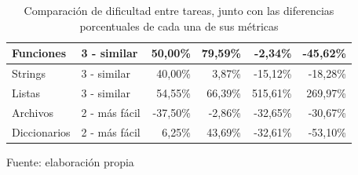 \documentclass[letterpaper,12pt]{article}
\begin{document}
\begin{table}[H]
\begin{tabular}{|l|l|r|r|r|r|}
    Funciones       & 3 - similar                                                                  & 50,00\%                                                                                                   & 79,59\%                                                                                         & -2,34\%                                                                                    & -45,62\%                                                                                  \\ \hline
    Strings         & 3 - similar                                                                  & 40,00\%                                                                                                   & 3,87\%                                                                                          & -15,12\%                                                                                   & -18,28\%                                                                                  \\ \hline
    Listas          & 3 - similar                                                                  & 54,55\%                                                                                                   & 66,39\%                                                                                         & 515,61\%                                                                                   & 269,97\%                                                                                  \\ \hline
    Archivos        & 2 - más fácil                                                                & -37,50\%                                                                                                  & -2,86\%                                                                                         & -32,65\%                                                                                   & -30,67\%                                                                                  \\ \hline
    Diccionarios    & 2 - más fácil                                                                & 6,25\%                                                                                                    & 43,69\%                                                                                         & -32,61\%                                                                                   & -53,10\%                                                                                  \\ \hline
  \end{tabular}
  \caption{Comparación de dificultad entre tareas, junto con las diferencias porcentuales de cada una de sus métricas} Fuente: elaboración propia
  \label{tab:porcentualDif}
\end{table}
\end{document}
